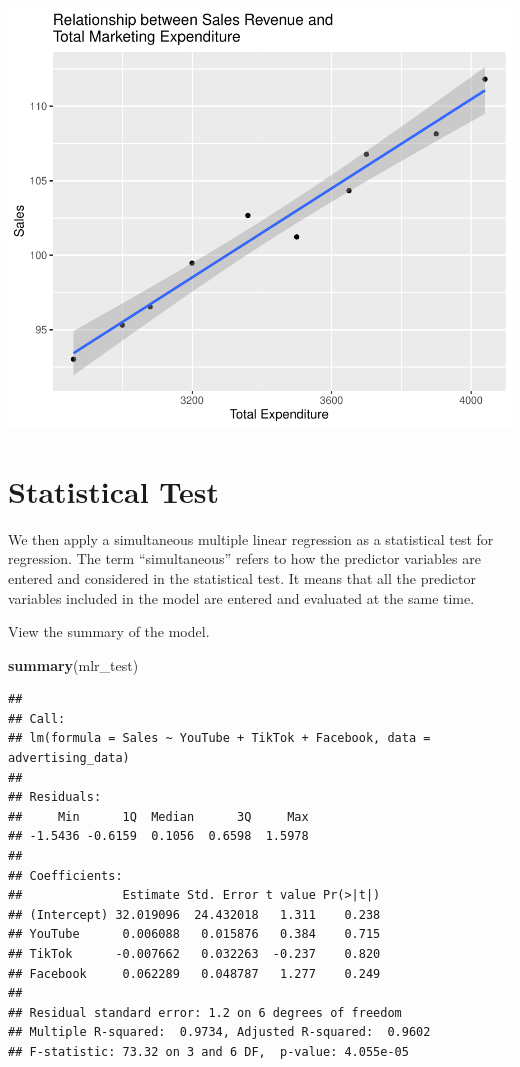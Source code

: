 \documentclass[
]{article}
\newenvironment{Shaded}{\begin{snugshade}}{\end{snugshade}}
\newcommand{\FunctionTok}[1]{\textcolor[rgb]{0.13,0.29,0.53}{\textbf{#1}}}
\newcommand{\NormalTok}[1]{#1}
\begin{document}
\includegraphics{2_multiple_linear_regression_files/figure-latex/scatter_plot_3-1.pdf}

\section{Statistical Test}\label{statistical-test}

We then apply a simultaneous multiple linear regression as a statistical
test for regression. The term ``simultaneous'' refers to how the
predictor variables are entered and considered in the statistical test.
It means that all the predictor variables included in the model are
entered and evaluated at the same time.

View the summary of the model.

\begin{Shaded}
\begin{Highlighting}[]
\FunctionTok{summary}\NormalTok{(mlr\_test)}
\end{Highlighting}
\end{Shaded}

\begin{verbatim}
## 
## Call:
## lm(formula = Sales ~ YouTube + TikTok + Facebook, data = advertising_data)
## 
## Residuals:
##     Min      1Q  Median      3Q     Max 
## -1.5436 -0.6159  0.1056  0.6598  1.5978 
## 
## Coefficients:
##              Estimate Std. Error t value Pr(>|t|)
## (Intercept) 32.019096  24.432018   1.311    0.238
## YouTube      0.006088   0.015876   0.384    0.715
## TikTok      -0.007662   0.032263  -0.237    0.820
## Facebook     0.062289   0.048787   1.277    0.249
## 
## Residual standard error: 1.2 on 6 degrees of freedom
## Multiple R-squared:  0.9734, Adjusted R-squared:  0.9602 
## F-statistic: 73.32 on 3 and 6 DF,  p-value: 4.055e-05
\end{verbatim}
\end{document}
